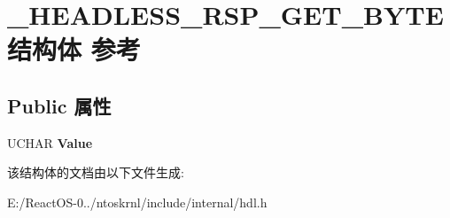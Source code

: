 \hypertarget{struct___h_e_a_d_l_e_s_s___r_s_p___g_e_t___b_y_t_e}{}\section{\+\_\+\+H\+E\+A\+D\+L\+E\+S\+S\+\_\+\+R\+S\+P\+\_\+\+G\+E\+T\+\_\+\+B\+Y\+T\+E结构体 参考}
\label{struct___h_e_a_d_l_e_s_s___r_s_p___g_e_t___b_y_t_e}
\subsection*{Public 属性}
\begin{DoxyCompactItemize}
\item 
\mbox{\label{struct___h_e_a_d_l_e_s_s___r_s_p___g_e_t___b_y_t_e_a352ece2bbf30173e1395e92191bf12bd}} 
U\+C\+H\+AR {\bfseries Value}
\end{DoxyCompactItemize}


该结构体的文档由以下文件生成\+:\begin{DoxyCompactItemize}
\item 
E\+:/\+React\+O\+S-\/0../ntoskrnl/include/internal/hdl.\+h\end{DoxyCompactItemize}
